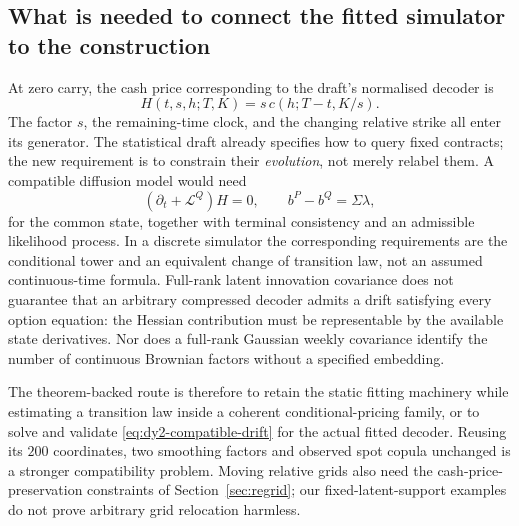 \documentclass[11pt,a4paper]{article}
\numberwithin{equation}{section}
\theoremstyle{definition}\newtheorem{definition}[theorem]{Definition}
\theoremstyle{remark}\newtheorem{remark}[theorem]{Remark}
\begin{document}
\subsection{What is needed to connect the fitted simulator to the construction}
At zero carry, the cash price corresponding to the draft's normalised decoder is
\[
 H(t,s,h;T,K)=s\,c(h;T-t,K/s).
\]
The factor $s$, the remaining-time clock, and the changing relative strike all enter its generator. The statistical draft already specifies how to query fixed contracts; the new requirement is to constrain their \emph{evolution}, not merely relabel them. A compatible diffusion model would need
\begin{equation}
 (\partial_t+\mathcal L^Q)H=0,\qquad
 b^P-b^Q=\Sigma\lambda,
 \label{eq:dy2-compatible-drift}
\end{equation}
for the common state, together with terminal consistency and an admissible likelihood process. In a discrete simulator the corresponding requirements are the conditional tower and an equivalent change of transition law, not an assumed continuous-time formula. Full-rank latent innovation covariance does not guarantee that an arbitrary compressed decoder admits a drift satisfying every option equation: the Hessian contribution must be representable by the available state derivatives. Nor does a full-rank Gaussian weekly covariance identify the number of continuous Brownian factors without a specified embedding.

The theorem-backed route is therefore to retain the static fitting machinery while estimating a transition law inside a coherent conditional-pricing family, or to solve and validate \eqref{eq:dy2-compatible-drift} for the actual fitted decoder. Reusing its $200$ coordinates, two smoothing factors and observed spot copula unchanged is a stronger compatibility problem. Moving relative grids also need the cash-price-preservation constraints of Section~\ref{sec:regrid}; our fixed-latent-support examples do not prove arbitrary grid relocation harmless.
\end{document}
